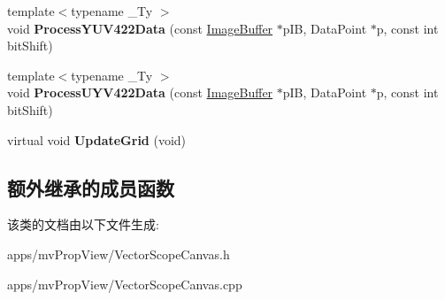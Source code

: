 \begin{DoxyCompactItemize}
\item 
\hypertarget{class_vector_scope_canvas_aa99b8a2ad6c162a9c424320d6129e4a2}{{\footnotesize template$<$typename \+\_\+\+Ty $>$ }\\void {\bfseries Process\+Y\+U\+V422\+Data} (const \hyperlink{struct_image_buffer}{Image\+Buffer} $\ast$p\+I\+B, Data\+Point $\ast$p, const int bit\+Shift)}\label{class_vector_scope_canvas_aa99b8a2ad6c162a9c424320d6129e4a2}

\item 
\hypertarget{class_vector_scope_canvas_aaa41f5ef6c785cea7065a96006c1c313}{{\footnotesize template$<$typename \+\_\+\+Ty $>$ }\\void {\bfseries Process\+U\+Y\+V422\+Data} (const \hyperlink{struct_image_buffer}{Image\+Buffer} $\ast$p\+I\+B, Data\+Point $\ast$p, const int bit\+Shift)}\label{class_vector_scope_canvas_aaa41f5ef6c785cea7065a96006c1c313}

\item 
\hypertarget{class_vector_scope_canvas_a138c6b17ef880525e98a4e513520c52f}{virtual void {\bfseries Update\+Grid} (void)}\label{class_vector_scope_canvas_a138c6b17ef880525e98a4e513520c52f}

\end{DoxyCompactItemize}
\subsection*{额外继承的成员函数}


该类的文档由以下文件生成\+:\begin{DoxyCompactItemize}
\item 
apps/mv\+Prop\+View/Vector\+Scope\+Canvas.\+h\item 
apps/mv\+Prop\+View/Vector\+Scope\+Canvas.\+cpp\end{DoxyCompactItemize}
